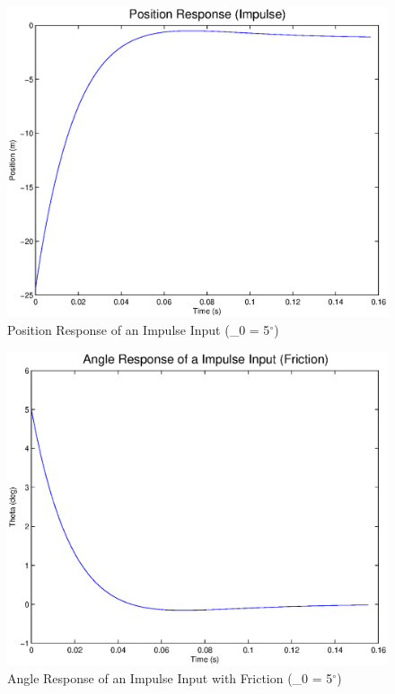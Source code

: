 \documentclass{article}
\begin{document}
\begin{figure}[!htb]
    \centering
    \includegraphics[scale=0.6]{5}
    \caption{Position Response of an Impulse Input (\theta_0 = 5$^{\circ}$)}
\end{figure} 

\begin{figure}[!htb]
    \centering
    \includegraphics[scale=0.6]{6}
    \caption{Angle Response of an Impulse Input with Friction (\theta_0 = 5$^{\circ}$)}
\end{figure} 
\end{document}

